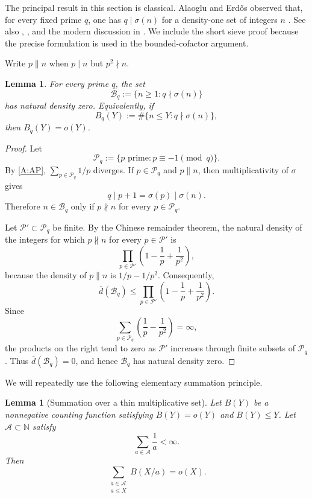 \documentclass[11pt]{article}
\newtheorem{lemma}[theorem]{Lemma}
\theoremstyle{definition}
\theoremstyle{remark}
\newcommand{\N}{\mathbb N}
\newcommand{\Pset}{\mathscr P}
\newcommand{\upperdens}{\overline d}
\begin{document}
The principal result in this section is classical.  Alaoglu and
Erd\H{o}s observed that, for every fixed prime $q$, one has
$q\mid\sigma(n)$ for a density-one set of integers $n$
\cite[p.~882]{AlaogluErdos}.  See also
\cite[Theorem~2]{Pomerance1977}, \cite[Lemma~5]{PollackPomerance},
and the modern discussion in \cite[\S1]{LebowitzPollackSinghaRoy}.
We include the short sieve proof because the precise formulation is
used in the bounded-cofactor argument.

Write $p\parallel n$ when $p\mid n$ but $p^2\nmid n$.

\begin{lemma}\label{lem:sigma-avoid}
For every prime $q$, the set
\[
\mathcal B_q:=\{n\geq1:q\nmid\sigma(n)\}
\]
has natural density zero.  Equivalently, if
\[
B_q(Y):=\#\{n\leq Y:q\nmid\sigma(n)\},
\]
then $B_q(Y)=o(Y)$.
\end{lemma}

\begin{proof}
Let
\[
\Pset_q:=\{p\text{ prime}:p\equiv-1\pmod q\}.
\]
By \ref{A:AP}, $\sum_{p\in\Pset_q}1/p$ diverges.  If $p\in\Pset_q$ and $p\parallel n$, then multiplicativity of $\sigma$ gives
\[
q\mid p+1=\sigma(p)\mid\sigma(n).
\]
Therefore $n\in\mathcal B_q$ only if $p\nparallel n$ for every $p\in\Pset_q$.

Let $\Pset'\subset\Pset_q$ be finite.  By the Chinese remainder theorem, the natural density of the integers for which $p\nparallel n$ for every $p\in\Pset'$ is
\[
\prod_{p\in\Pset'}
\left(1-\frac1p+\frac1{p^2}\right),
\]
because the density of $p\parallel n$ is $1/p-1/p^2$.  Consequently,
\[
\upperdens(\mathcal B_q)
\leq
\prod_{p\in\Pset'}
\left(1-\frac1p+\frac1{p^2}\right).
\]
Since
\[
\sum_{p\in\Pset_q}\left(\frac1p-\frac1{p^2}\right)=\infty,
\]
the products on the right tend to zero as $\Pset'$ increases through finite subsets of $\Pset_q$.  Thus $\upperdens(\mathcal B_q)=0$, and hence $\mathcal B_q$ has natural density zero.
\end{proof}

We will repeatedly use the following elementary summation principle.

\begin{lemma}[Summation over a thin multiplicative set]\label{lem:transfer}
Let $B(Y)$ be a nonnegative counting function satisfying $B(Y)=o(Y)$ and $B(Y)\leq Y$.  Let $\mathcal A\subset\N$ satisfy
\[
\sum_{a\in\mathcal A}\frac1a<\infty.
\]
Then
\[
\sum_{\substack{a\in\mathcal A\\a\leq X}}B(X/a)=o(X).
\]
\end{lemma}
\end{document}
